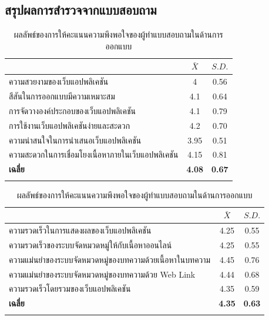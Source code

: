 \documentclass[12pt,oneside,openright,a4paper]{cpe-thai-project}
\begin{document}
    \subsection{สรุปผลการสำรวจจากแบบสอบถาม}
      \begin{longtable}{lcc}
        \caption{ผลลัพธ์ของการให้คะแนนความพึงพอใจของผู้ทำแบบสอบถามในด้านการออกแบบ}
        \label{tbl:design_score}\\
        \hhline{===}
        \multicolumn{1}{c}{\textbf{หัวข้อ}}                & \textbf{$\bar{X}$} & \textbf{$S.D.$} \\ \hline
        \endhead
        ความสวยงามของเว็บแอปพลิเคชัน                       & 4          & 0.56          \\
        สีสันในการออกแบบมีความเหมาะสม                      & 4.1        & 0.64          \\
        การจัดวางองค์ประกอบของเว็บแอปพลิเคชัน              & 4.1        & 0.79          \\
        การใช้งานเว็บแอปพลิเคชันง่ายและสะดวก               & 4.2        & 0.70          \\
        ความน่าสนใจในการนำเสนอเว็บแอปพลิเคชัน              & 3.95       & 0.51          \\
        ความสะดวกในการเชื่อมโยงเนื้อหาภายในเว็บแอปพลิเคชัน & 4.15       & 0.81          \\ \hline
        \textbf{เฉลี่ย}                                    & \textbf{4.08}        & \textbf{0.67}     \\ \hhline{===}    
      \end{longtable}
      \begin{longtable}{lcc}
        \caption{ผลลัพธ์ของการให้คะแนนความพึงพอใจของผู้ทำแบบสอบถามในด้านการออกแบบ}
        \label{tbl:eff_score}\\
        \hhline{===}
        \multicolumn{1}{c}{\textbf{หัวข้อ}}                & \textbf{$\bar{X}$} & \textbf{$S.D.$} \\ \hline
        \endhead
        ความรวดเร็วในการแสดงผลของเว็บแอปพลิเคชัน                        & 4.25          & 0.55          \\
        ความรวดเร็วของระบบจัดหมวดหมู่ให้กับเนื้อหาออนไลน์                   & 4.25        & 0.55          \\
        ความแม่นยำของระบบจัดหมวดหมู่ของบทความด้วยเนื้อหาในบทความ         & 4.45        & 0.76          \\
        ความแม่นยำของระบบจัดหมวดหมู่ของบทความด้วย Web Link             & 4.44        & 0.68          \\
        ความรวดเร็วโดยรวมของเว็บแอปพลิเคชัน                             & 4.35       & 0.59          \\ \hline
        \textbf{เฉลี่ย}                                              & \textbf{4.35}        & \textbf{0.63}     \\ \hhline{===}    
      \end{longtable}
\end{document}
